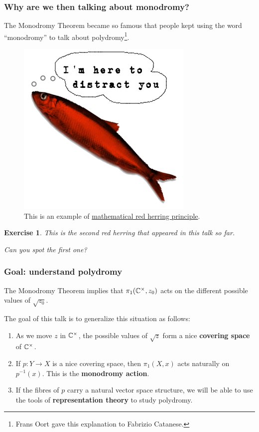 \documentclass[notheorems, hyperref={backref}]{beamer}
\newtheorem{exe}{Exercise}
\begin{document}
\begin{frame}
    \frametitle{Why are we then talking about monodromy?}
    The Monodromy Theorem became so famous that people kept using the word ``monodromy'' to talk about polydromy\footnote{Frans Oort gave this explanation to Fabrizio Catanese.}.
    \pause
    \begin{figure}[htp]
	\centering
	\includegraphics[scale=.3]{pictures/RedHerring.png}
	\caption{This is an example of \href{https://ncatlab.org/nlab/show/red+herring+principle}{mathematical red herring principle}.}
    \end{figure}
    \pause
    \setcounter{exe}{-1}
    \begin{exe}
	This is the second red herring that appeared in this talk so far.

	Can you spot the first one?
    \end{exe}
\end{frame}

\begin{frame}
    \frametitle{Goal: understand polydromy}
    The Monodromy Theorem implies that $\pi_{1}(\mathbb{C}^{\times},z_{0})$ acts on the different possible values of $\sqrt{z_{0}}$.
    \pause

    The goal of this talk is to generalize this situation as follows:
    \pause
    \begin{enumerate}[label=\textbullet]
	\setlength\itemsep{1em}
	\item As we move $z$ in $\mathbb{C}^{\times}$, the possible values of $\sqrt{z}$ form a nice \textbf{covering space} of $\mathbb{C}^{\times}$.
	\pause
	\item If $p\colon Y\to X$ is a nice covering space, then $\pi_{1}(X,x)$ acts naturally on $p^{-1}(x)$.
	    This is the \textbf{monodromy action}.
	\pause
    \item If the fibres of $p$ carry a natural vector space structure, we will be able to use the tools of \textbf{representation theory} to study polydromy.
    \end{enumerate}
\end{frame}
\end{document}
